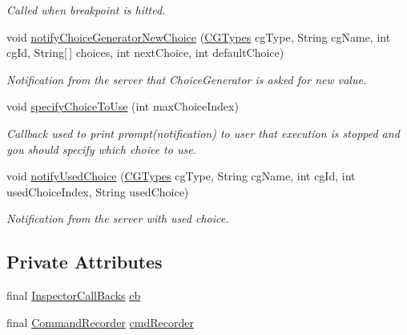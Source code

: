\begin{DoxyCompactItemize}
\begin{DoxyCompactList}\small\item\em Called when breakpoint is hitted. \end{DoxyCompactList}\item 
void \hyperlink{classgov_1_1nasa_1_1jpf_1_1inspector_1_1client_1_1_callback_recording_decorator_a52f0617456d4e4fc39189c2f29c28c89}{notify\+Choice\+Generator\+New\+Choice} (\hyperlink{enumgov_1_1nasa_1_1jpf_1_1inspector_1_1interfaces_1_1_choice_generators_interface_1_1_c_g_types}{C\+G\+Types} cg\+Type, String cg\+Name, int cg\+Id, String\mbox{[}$\,$\mbox{]} choices, int next\+Choice, int default\+Choice)
\begin{DoxyCompactList}\small\item\em Notification from the server that Choice\+Generator is asked for new value. \end{DoxyCompactList}\item 
void \hyperlink{classgov_1_1nasa_1_1jpf_1_1inspector_1_1client_1_1_callback_recording_decorator_a44e8a9f3a8ac006b584413c212ecdcb7}{specify\+Choice\+To\+Use} (int max\+Choice\+Index)
\begin{DoxyCompactList}\small\item\em Callback used to print prompt(notification) to user that execution is stopped and you should specify which choice to use. \end{DoxyCompactList}\item 
void \hyperlink{classgov_1_1nasa_1_1jpf_1_1inspector_1_1client_1_1_callback_recording_decorator_ae2c70bb6f3e94309abb4bfa4b15cd990}{notify\+Used\+Choice} (\hyperlink{enumgov_1_1nasa_1_1jpf_1_1inspector_1_1interfaces_1_1_choice_generators_interface_1_1_c_g_types}{C\+G\+Types} cg\+Type, String cg\+Name, int cg\+Id, int used\+Choice\+Index, String used\+Choice)
\begin{DoxyCompactList}\small\item\em Notification from the server with used choice. \end{DoxyCompactList}\end{DoxyCompactItemize}
\subsection*{Private Attributes}
\begin{DoxyCompactItemize}
\item 
final \hyperlink{interfacegov_1_1nasa_1_1jpf_1_1inspector_1_1interfaces_1_1_inspector_call_backs}{Inspector\+Call\+Backs} \hyperlink{classgov_1_1nasa_1_1jpf_1_1inspector_1_1client_1_1_callback_recording_decorator_a12851029ed70d54263ba4d4a3e10ea90}{cb}
\item 
final \hyperlink{classgov_1_1nasa_1_1jpf_1_1inspector_1_1client_1_1_command_recorder}{Command\+Recorder} \hyperlink{classgov_1_1nasa_1_1jpf_1_1inspector_1_1client_1_1_callback_recording_decorator_a5bfada9e89b8d63d85607b33b6acb0aa}{cmd\+Recorder}
\end{DoxyCompactItemize}


